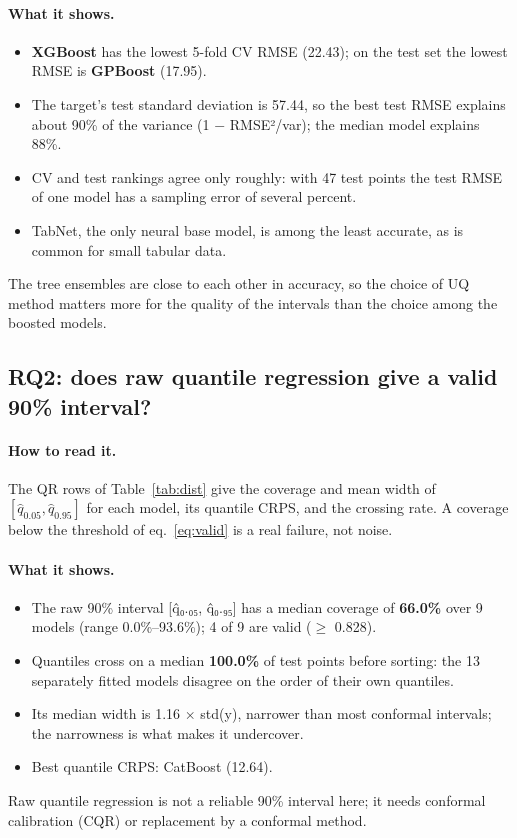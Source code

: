 \documentclass[11pt]{article}
\begin{document}
\paragraph{What it shows.}
\begin{itemize}
\item \textbf{XGBoost} has the lowest 5-fold CV RMSE (22.43); on the test set the lowest RMSE is \textbf{GPBoost} (17.95).
\item The target's test standard deviation is 57.44, so the best test RMSE explains about 90\% of the variance (1 $-$ RMSE²/var); the median model explains 88\%.
\item CV and test rankings agree only roughly: with 47 test points the test RMSE of one model has a sampling error of several percent.
\item TabNet, the only neural base model, is among the least accurate, as is common for small tabular data.
\end{itemize}
\begin{insight}[Takeaway RQ1]
The tree ensembles are close to each other in accuracy, so the choice of UQ method matters more for the quality of the intervals than the choice among the boosted models.
\end{insight}

\subsection{RQ2: does raw quantile regression give a valid 90\% interval?}
\paragraph{How to read it.} The QR rows of Table~\ref{tab:dist} give the coverage and mean width of $[\hat q_{0.05},\hat q_{0.95}]$ for each model, its quantile CRPS, and the crossing rate. A coverage below the threshold of eq.~\eqref{eq:valid} is a real failure, not noise.
\paragraph{What it shows.}
\begin{itemize}
\item The raw 90\% interval [q̂₀.₀₅, q̂₀.₉₅] has a median coverage of \textbf{66.0\%} over 9 models (range 0.0\%--93.6\%); 4 of 9 are valid ($\geq$ 0.828).
\item Quantiles cross on a median \textbf{100.0\%} of test points before sorting: the 13 separately fitted models disagree on the order of their own quantiles.
\item Its median width is 1.16 $\times$ std(y), narrower than most conformal intervals; the narrowness is what makes it undercover.
\item Best quantile CRPS: CatBoost (12.64).
\end{itemize}
\begin{insight}[Takeaway RQ2]
Raw quantile regression is not a reliable 90\% interval here; it needs conformal calibration (CQR) or replacement by a conformal method.
\end{insight}
\end{document}
